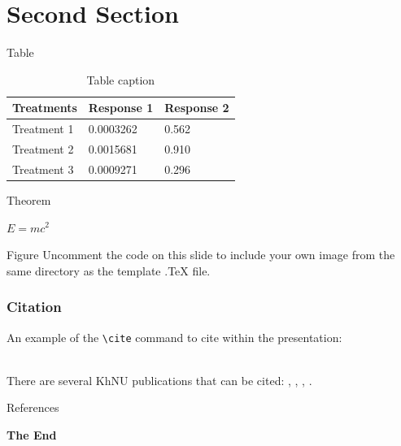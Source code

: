 \documentclass[aspectratio=169,xcolor=dvipsnames]{beamer}
\begin{document}
\section{Second Section}

\begin{frame}{Table}
    \begin{table}
        \begin{tabular}{l l l}
            \toprule
            \textbf{Treatments} & \textbf{Response 1} & \textbf{Response 2} \\
            \midrule
            Treatment 1         & 0.0003262           & 0.562               \\
            Treatment 2         & 0.0015681           & 0.910               \\
            Treatment 3         & 0.0009271           & 0.296               \\
            \bottomrule
        \end{tabular}
        \caption{Table caption}
    \end{table}
\end{frame}


\begin{frame}{Theorem}
    \begin{theorem}
        $E = mc^2$
    \end{theorem}
\end{frame}


\begin{frame}{Figure}
    Uncomment the code on this slide to include your own image from the same directory as the template .TeX file.
\end{frame}


\begin{frame}[fragile] %
    \frametitle{Citation}
    An example of the \verb|\cite| command to cite within the presentation:\\~

    There are several KhNU publications that can be cited: \cite{wiedau2019enpro}, \cite{oeing2022using}, \cite{cameron2024dexpi}, \cite{otten2024dexpi}.
\end{frame}


\begin{frame}{References}
    \footnotesize
    
    
\end{frame}


\begin{frame}
    \Huge{\centerline{\textbf{The End}}}
\end{frame}
\end{document}
